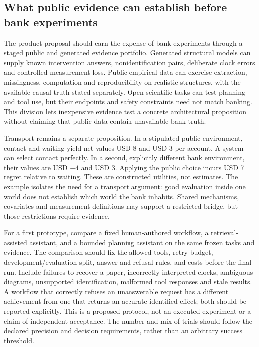 \subsection{What public evidence can establish before bank experiments}

The product proposal should earn the expense of bank experiments through a staged
public and generated evidence portfolio. Generated structural models can supply
known intervention answers, nonidentification pairs, deliberate clock errors and
controlled measurement loss. Public empirical data can exercise extraction,
missingness, computation and reproducibility on realistic structures, with the
available causal truth stated separately. Open scientific tasks can test planning
and tool use, but their endpoints and safety constraints need not match banking.
This division lets inexpensive evidence test a concrete architectural proposition
without claiming that public data contain unavailable bank truth.

Transport remains a separate proposition. In a stipulated public environment,
contact and waiting yield net values USD 8 and USD 3 per account. A system can
select contact perfectly. In a second, explicitly different bank environment,
their values are USD $-4$ and USD 3. Applying the public choice incurs USD 7
regret relative to waiting. These are constructed utilities, not estimates. The
example isolates the need for a transport argument: good evaluation inside one
world does not establish which world the bank inhabits. Shared mechanisms,
covariates and measurement definitions may support a restricted bridge, but
those restrictions require evidence.~\citep{exec24_scimethod_reference}

For a first prototype, compare a fixed human-authored workflow, a retrieval-assisted
assistant, and a bounded planning assistant on the same frozen tasks and evidence.
The comparison should fix the allowed tools, retry budget, development/evaluation
split, answer and refusal rules, and costs before the final run. Include failures
to recover a paper, incorrectly interpreted clocks, ambiguous diagrams, unsupported
identification, malformed tool responses and stale results. A workflow that
correctly refuses an unanswerable request has a different achievement from one
that returns an accurate identified effect; both should be reported explicitly.
This is a proposed protocol, not an executed experiment or a claim of independent
acceptance. The number and mix of trials should follow the declared precision
and decision requirements, rather than an arbitrary success threshold.

